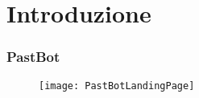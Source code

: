 
\section{Introduzione}
\begin{frame}

  \frametitle{PastBot}

  \begin{figure}[H]
    \centering
    \texttt{[image: PastBotLandingPage]}
  \end{figure}
  
\end{frame}
